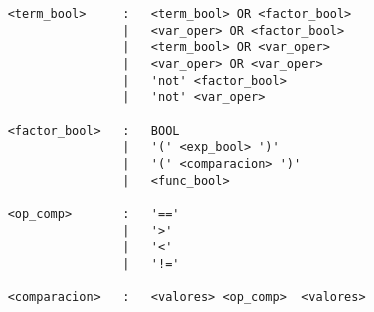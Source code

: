 \begin{verbatim}
    <term_bool>     :   <term_bool> OR <factor_bool>
                    |   <var_oper> OR <factor_bool>
                    |   <term_bool> OR <var_oper>
                    |   <var_oper> OR <var_oper>
                    |   'not' <factor_bool>
                    |   'not' <var_oper>

    <factor_bool>   :   BOOL
                    |   '(' <exp_bool> ')'
                    |   '(' <comparacion> ')'
                    |   <func_bool>

    <op_comp>       :   '=='
                    |   '>'
                    |   '<'
                    |   '!='

    <comparacion>   :   <valores> <op_comp>  <valores>

    
\end{verbatim}
%
%
